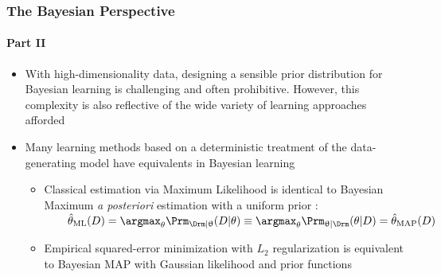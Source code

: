 \documentclass[aspectratio=169,usenames,dvipsnames]{beamer}
\begin{document}
\begin{frame}
\frametitle{The Bayesian Perspective}
\framesubtitle{Part II}

\begin{itemize}
\item With high-dimensionality data, designing a sensible prior distribution for Bayesian learning is challenging and often prohibitive. However, this complexity is also reflective of the wide variety of learning approaches afforded
\vspace{0.5em}
\item Many learning methods based on a deterministic treatment of the data-generating model have \alert{equivalents} in Bayesian learning
\vspace{0.25em}
	\begin{itemize}
	\item Classical estimation via Maximum Likelihood is identical to Bayesian Maximum \emph{a posteriori} estimation with a uniform prior : \\
	\vspace{0.25em}
	$\qquad \hat{\theta}_{\mathrm{ML}}(D) = \argmax_{\theta} \Prm_{\Drm | \uptheta}(D | \theta) \equiv \argmax_{\theta} \Prm_{\uptheta | \Drm}(\theta | D) = \hat{\theta}_{\mathrm{MAP}}(D)$
	\vspace{0.25em}
	\item Empirical squared-error minimization with $L_2$ regularization is equivalent to Bayesian MAP with Gaussian likelihood and prior functions 
	\end{itemize}

\end{itemize}


\vspace{0.5em}
\centering
{}
\vspace{0.5em}

\end{frame}
\end{document}
